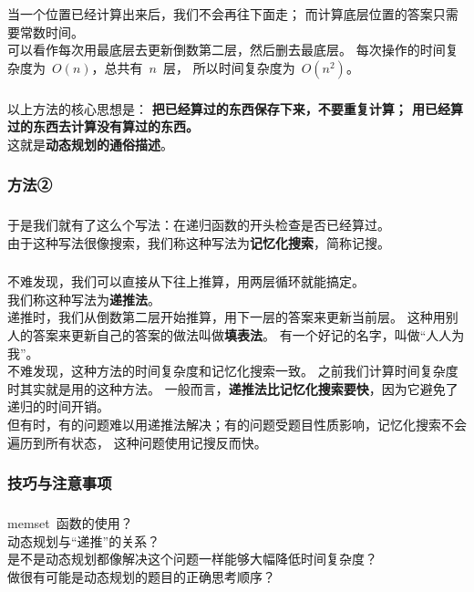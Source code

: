 \documentclass[UTF8]{beamer}
\begin{document}
	\begin{frame}
		\frametitle{\insertsubsubsection}
		当一个位置已经计算出来后，我们不会再往下面走；
		而计算底层位置的答案只需要常数时间。
		\\
		可以看作每次用最底层去更新倒数第二层，然后删去最底层。
		每次操作的时间复杂度为~$O(n)$，总共有~$n$~层，
		所以时间复杂度为~$O(n^2)$。
	\end{frame}

	\begin{frame}
		\frametitle{\insertsubsubsection}
		以上方法的核心思想是：
		\textbf{把已经算过的东西保存下来，不要重复计算；
		用已经算过的东西去计算没有算过的东西。}
		\\\pause
		这就是\textbf{动态规划的通俗描述}。
	\end{frame}

	\subsubsection{方法②}
	\begin{frame}
		\frametitle{\insertsubsubsection}
		于是我们就有了这么个写法：在递归函数的开头检查是否已经算过。
		\\\pause
		由于这种写法很像搜索，我们称这种写法为\textbf{记忆化搜索}，简称记搜。
	\end{frame}

	\begin{frame}
		\frametitle{\insertsubsubsection}
		不难发现，我们可以直接从下往上推算，用两层循环就能搞定。
		\\
		我们称这种写法为\textbf{递推法}。
		\\\pause
		递推时，我们从倒数第二层开始推算，用下一层的答案来更新当前层。
		这种用别人的答案来更新自己的答案的做法叫做\textbf{填表法}。
		有一个好记的名字，叫做“人人为我”。
		\\\pause
		不难发现，这种方法的时间复杂度和记忆化搜索一致。
		之前我们计算时间复杂度时其实就是用的这种方法。
		一般而言，\textbf{递推法比记忆化搜索要快}，因为它避免了递归的时间开销。
		\\\pause
		但有时，有的问题难以用递推法解决；有的问题受题目性质影响，记忆化搜索不会遍历到所有状态，
		这种问题使用记搜反而快。
	\end{frame}

	\subsubsection{技巧与注意事项}
	\begin{frame}
		\frametitle{\insertsubsubsection}
		memset~函数的使用？
		\\\pause
		动态规划与“递推”的关系？
		\\\pause
		是不是动态规划都像解决这个问题一样能够大幅降低时间复杂度？
		\\\pause
		做很有可能是动态规划的题目的正确思考顺序？
	\end{frame}
\end{document}
